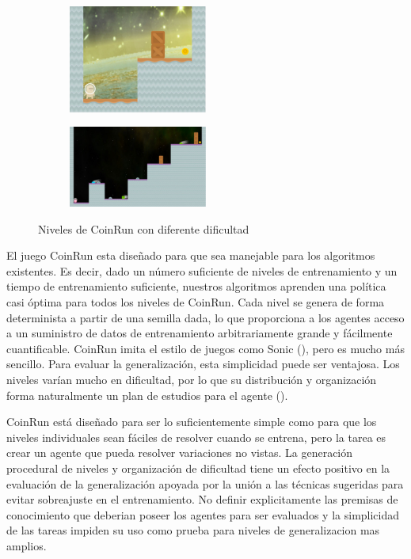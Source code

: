\begin{figure}[ht!]
    \begin{subfigure}
      \centering
      \includegraphics[width=0.5\textwidth]{Graphics/coinrun_1.jpeg}
      \label{fig:coinrun1}
    \end{subfigure}%
    \begin{subfigure}
      \centering
      \includegraphics[width=0.5\textwidth]{Graphics/coinrun_2.jpeg}
      \label{fig:coinrun2}
    \end{subfigure}%
    \caption{Niveles de CoinRun con diferente dificultad}
    \label{fig:coinrun}
\end{figure}

El juego CoinRun esta diseñado para que sea manejable para los algoritmos existentes. Es decir, dado un número suficiente de niveles de entrenamiento y un tiempo de entrenamiento suficiente, nuestros algoritmos aprenden una política casi óptima para todos los niveles de CoinRun. Cada nivel se genera de forma determinista a partir de una semilla dada, lo que proporciona a los agentes acceso a un suministro de datos de entrenamiento arbitrariamente grande y fácilmente cuantificable. CoinRun imita el estilo de juegos como Sonic (\cite{nichol2018gotta}), pero es mucho más sencillo. Para evaluar la generalización, esta simplicidad puede ser ventajosa. Los niveles varían mucho en dificultad, por lo que su distribución y organización forma naturalmente un plan de estudios para el agente (\cite{cobbe2019quantifying}).

CoinRun está diseñado para ser lo suficientemente simple como para que los niveles individuales sean fáciles de resolver cuando se entrena, pero la tarea es crear un agente que pueda resolver variaciones no vistas. La generación procedural de niveles y organización de dificultad tiene un efecto positivo en la evaluación de la generalización apoyada por la unión a las técnicas sugeridas para evitar sobreajuste en el entrenamiento. No definir explicitamente las premisas de conocimiento que deberian poseer los agentes para ser evaluados y la simplicidad de las tareas impiden su uso como prueba para niveles de generalizacion mas amplios.

